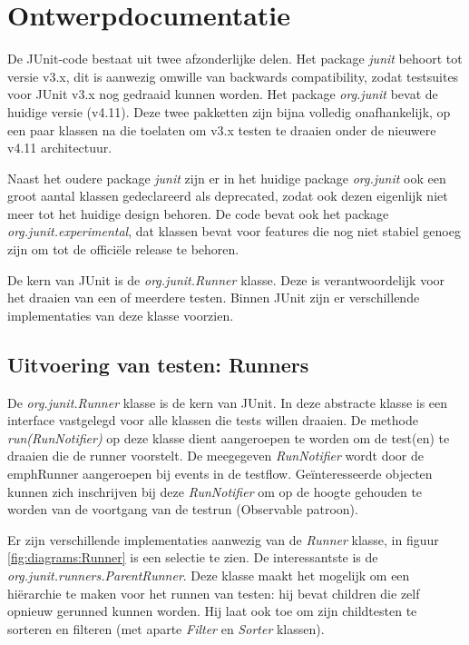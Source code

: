 \documentclass[i1]{oss}
\begin{document}
\section{Ontwerpdocumentatie}

De JUnit-code bestaat uit twee afzonderlijke delen. Het package \emph{junit} behoort tot versie v3.x, dit is aanwezig omwille van backwards compatibility, zodat testsuites voor JUnit v3.x nog gedraaid kunnen worden. Het package \emph{org.junit} bevat de huidige versie (v4.11). Deze twee pakketten zijn bijna volledig onafhankelijk, op een paar klassen na die toelaten om v3.x testen te draaien onder de nieuwere v4.11 architectuur.

Naast het oudere package \emph{junit} zijn er in het huidige package \emph{org.junit} ook een groot aantal klassen gedeclareerd als deprecated, zodat ook dezen eigenlijk niet meer tot het huidige design behoren. De code bevat ook het package \emph{org.junit.experimental}, dat klassen bevat voor features die nog niet stabiel genoeg zijn om tot de offici\"ele release te behoren.

De kern van JUnit is de \emph{org.junit.Runner} klasse. Deze is verantwoordelijk voor het draaien van een of meerdere testen. Binnen JUnit zijn er verschillende implementaties van deze klasse voorzien. 

\subsection{Uitvoering van testen: Runners}

De \emph{org.junit.Runner} klasse is de kern van JUnit. In deze abstracte klasse is een interface vastgelegd voor alle klassen die tests willen draaien. De methode \emph{run(RunNotifier)} op deze klasse dient aangeroepen te worden om de test(en) te draaien die de runner voorstelt. De meegegeven \emph{RunNotifier} wordt door de emph{Runner} aangeroepen bij events in de testflow. Ge\"interesseerde objecten kunnen zich inschrijven bij deze \emph{RunNotifier} om op de hoogte gehouden te worden van de voortgang van de testrun (Observable patroon).

Er zijn verschillende implementaties aanwezig van de \emph{Runner} klasse, in figuur \ref{fig:diagrams:Runner} is een selectie te zien. De interessantste is de \emph{org.junit.runners.ParentRunner}. Deze klasse maakt het mogelijk om een hi\"erarchie te maken voor het runnen van testen: hij bevat children die zelf opnieuw gerunned kunnen worden. Hij laat ook toe om zijn childtesten te sorteren en filteren (met aparte \emph{Filter} en \emph{Sorter} klassen).
\end{document}
